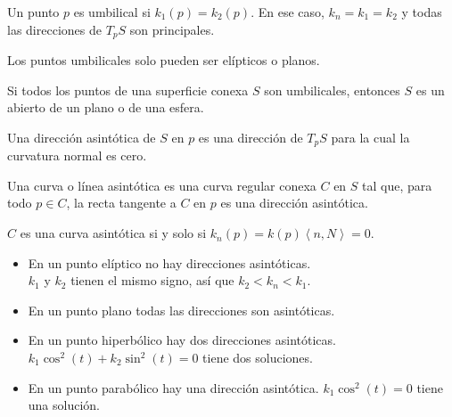 \begin{definition}
    Un punto $p$ es umbilical si $k_1(p) = k_2(p)$.
    En ese caso, $k_n = k_1 = k_2$ y todas las direcciones de $T_pS$ son principales.
\end{definition}

\begin{remark}
    Los puntos umbilicales solo pueden ser elípticos o planos.
\end{remark}

\begin{theorem}
    Si todos los puntos de una superficie conexa $S$ son umbilicales, entonces $S$ es un abierto de un plano o de una esfera.
\end{theorem}

\begin{definition}
    Una dirección asintótica de $S$ en $p$ es una dirección de $T_pS$ para la cual la curvatura normal es cero.
\end{definition}

\begin{definition}
    Una curva o línea asintótica es una curva regular conexa $C$ en $S$ tal que, para todo $p \in C$, la recta tangente a $C$ en $p$ es una dirección asintótica.
\end{definition}

\begin{note}
    $C$ es una curva asintótica si y solo si $k_n(p) = k(p) \left\langle n, N \right\rangle = 0$.
\end{note}

\begin{remark}
    \hfill
    \begin{itemize}
        \item En un punto elíptico no hay direcciones asintóticas.\\
              $k_1$ y $k_2$ tienen el mismo signo, así que $k_2 < k_n < k_1$.
        \item En un punto plano todas las direcciones son asintóticas.
        \item En un punto hiperbólico hay dos direcciones asintóticas.\\
              $k_1 \cos^2(t) + k_2 \sin^2(t) = 0$ tiene dos soluciones.
        \item En un punto parabólico hay una dirección asintótica.
              $k_1 \cos^2(t) = 0$ tiene una solución.
    \end{itemize}
\end{remark}

